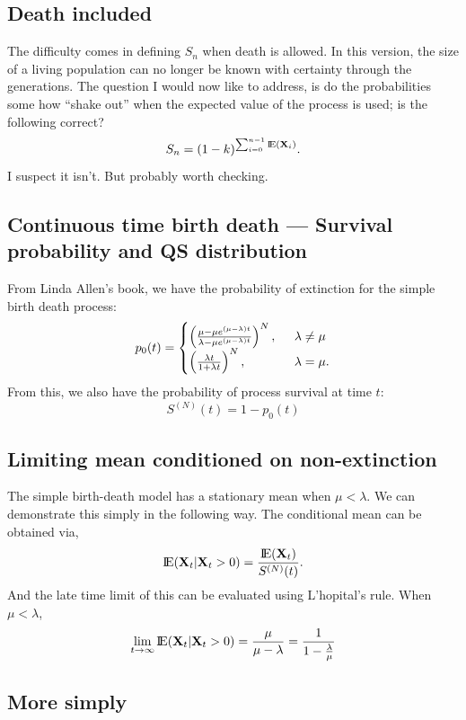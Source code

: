 \subsection*{Death included}
The difficulty comes in defining $S_n$ when death is allowed. In this version, the size of a living population can no longer be known with certainty through the generations. The question I would now like to address, is do the probabilities some how ``shake out'' when the expected value of the process is used; is the following correct? 
$$S_n  = (1-k)^{\sum^{n-1}_{i=0}{\rm I}\!{\rm E}({\bf X}_i)}.$$
I suspect it isn't. But probably worth checking. 


\subsection{Continuous time birth death --- Survival probability and QS distribution}


From Linda Allen's book, we have the probability of extinction for the simple birth death process: 
$$p_0(t) = \begin{cases}
\left(\frac{\mu - \mu e^{(\mu - \lambda) t }}{  \lambda  - \mu e^{(\mu - \lambda) t }}\right)^N, \;\; &\lambda \neq \mu\\ 
\left(\frac{\lambda t}{1 + \lambda t}\right)^N, \;\;& \lambda = \mu.
\end{cases}$$
From this, we also have the probability of process survival at time $t$:
$$S^{(N)}(t) = 1 - p_0(t)$$

\subsection*{Limiting mean conditioned on non-extinction}
The simple birth-death model has a stationary mean when $\mu < \lambda$. We can demonstrate this simply in the following way. The conditional mean can be obtained via,
\begin{equation}
\label{condit}
{\rm I}\!{\rm E}({{\bf X}_t} | {{\bf X}_t} > 0) = \frac{{\rm I}\!{\rm E}({{\bf X}_t}) }{S^{(N)}(t)}.
\end{equation}
And the late time limit of this can be evaluated using L'hopital's rule. When $\mu < \lambda$, 
$$\lim_{t\to\infty}{\rm I}\!{\rm E}({{\bf X}_t} | {{\bf X}_t} > 0)  = \frac{\mu}{\mu - \lambda} = \frac{1}{1 - \frac{\lambda}{\mu}}$$

\subsection*{More simply}

